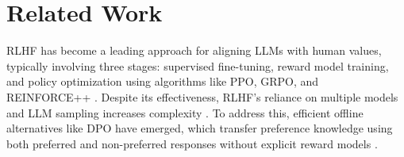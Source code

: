 \section{Related Work}
\label{sec:related_work}
RLHF has become a leading approach for aligning LLMs with human values, typically involving three stages: supervised fine-tuning, reward model training, and policy optimization using algorithms like PPO, GRPO, and REINFORCE++ \cite{ouyang2022training, casper2023open, achiam2023gpt}. Despite its effectiveness, RLHF’s reliance on multiple models and LLM sampling increases complexity \cite{zhao2023slic, casper2023open}. To address this, efficient offline alternatives like DPO have emerged, which transfer preference knowledge using both preferred and non-preferred responses without explicit reward models \cite{rafailov2023direct, xu2024contrastive, meng2024simpo}.

